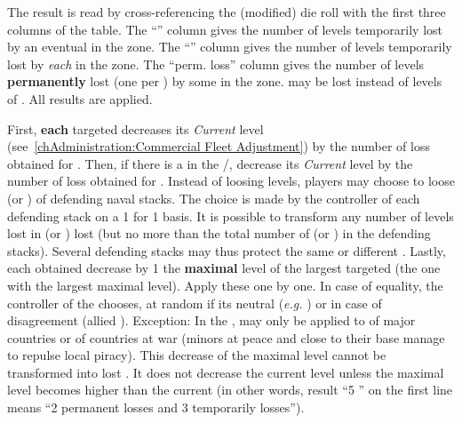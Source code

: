 \bparag The result is read by cross-referencing the (modified) die roll with
the first three columns of the table.
\bparag The ``\TradeFLEET\faceplus'' column gives the number of levels
temporarily lost by an eventual \TradeFLEET\faceplus in the zone.
\bparag The ``\TradeFLEET\facemoins'' column gives the number of levels
temporarily lost by \emph{each} \TradeFLEET\facemoins in the zone.
\bparag The ``perm. loss'' column gives the number of levels
\textbf{permanently} lost (one per \textetoile) by some \TradeFLEET in the
zone.
\bparag \ND may be lost instead of levels of \TradeFLEET.
\bparag All results are applied.


\bparag First, \textbf{each} targeted \TradeFLEET\facemoins decreases its
\emph{Current} level (see~\ref{chAdministration:Commercial Fleet Adjustment})
by the number of loss obtained for \TradeFLEET\facemoins.
\bparag Then, if there is a \TradeFLEET\faceplus in the \STZ/\CTZ, decrease
its \emph{Current} level by the number of loss obtained for
\TradeFLEET\faceplus.
\bparag Instead of loosing \TradeFLEET levels, players may choose to loose \ND
(or \NGD) of defending naval stacks. The choice is made by the controller of
each defending stack on a 1 for 1 basis. It is possible to transform any
number of levels lost in \ND (or \NGD) lost (but no more than the total number
of \ND (or \NGD) in the defending stacks). Several defending stacks may thus
protect the same or different \TradeFLEET.
\bparag Lastly, each \textetoile obtained decrease by 1 the \textbf{maximal}
level of the largest targeted \TradeFLEET (the one with the largest maximal
level). Apply these \textetoile one by one. In case of equality, the
controller of the \corsaire chooses, at random if its neutral (\emph{e.g.}
) or in case of disagreement (allied \corsaire).
\bparag Exception: In the \ROTW, \textetoile may only be applied to
\TradeFLEET of major countries or of countries at war (minors at peace and
close to their base manage to repulse local piracy).
\bparag This decrease of the maximal level cannot be transformed into lost
\ND. It does not decrease the current level unless the maximal level becomes
higher than the current (in other words, result ``5 \textetoile\textetoile''
on the first line means ``2 permanent losses and 3 temporarily losses'').

